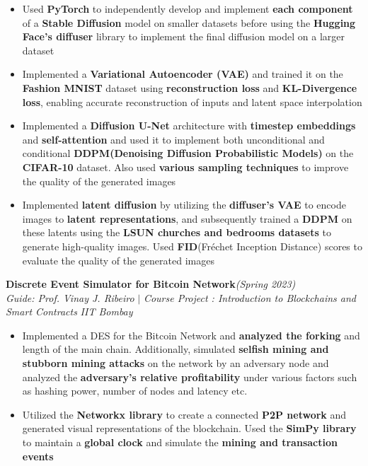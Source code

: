 \documentclass[a4paper,10pt]{article}
\begin{document}
\begin{itemize}[itemsep = -0.65 mm, leftmargin=*]
    \item Used \textbf{PyTorch} to independently develop and implement \textbf{each component} of a \textbf{Stable Diffusion} model on smaller datasets before using the \textbf{Hugging Face's diffuser} library to implement the final diffusion model on a larger dataset
    \item Implemented a \textbf{Variational Autoencoder (VAE)} and trained it on the \textbf{Fashion MNIST} dataset using \textbf{reconstruction loss} and \textbf{KL-Divergence loss}, enabling accurate reconstruction of inputs and latent space interpolation
    \item Implemented a \textbf{Diffusion U-Net} architecture with \textbf{timestep embeddings} and \textbf{self-attention} and used it to implement both unconditional and conditional \textbf{DDPM(Denoising Diffusion Probabilistic Models)} on the \textbf{CIFAR-10} dataset. Also used \textbf{various sampling techniques} to improve the quality of the generated images
    \item Implemented \textbf{latent diffusion} by utilizing the \textbf{diffuser's VAE} to encode images to \textbf{latent representations}, and subsequently trained a \textbf{DDPM} on these latents using the \textbf{LSUN churches and bedrooms datasets}  to generate high-quality images. Used \textbf{FID}(Fréchet Inception Distance) scores to evaluate the quality of the generated images
\end{itemize}
\vspace{\baselineskip}
\vspace{-15pt}
\noindent\textbf{\large Discrete Event Simulator for Bitcoin Network}\hfill{\sl \small (Spring 2023)}\\
{\it Guide: Prof. Vinay J. Ribeiro} $|$ {\it Course Project : Introduction to Blockchains and Smart Contracts } \hfill{\it IIT Bombay}\\
\vspace{-15pt}
\begin{itemize}[itemsep = -0.65 mm, leftmargin=*]
    \item Implemented a DES for the Bitcoin Network and \textbf{analyzed the forking} and length of the main chain. Additionally, simulated \textbf{selfish mining and stubborn mining attacks} on the network by an adversary node and analyzed the \textbf{adversary's relative profitability} under various factors such as hashing power, number of nodes and latency etc.
    \item Utilized the \textbf{Networkx library} to create a connected \textbf{P2P network} and generated visual representations of the blockchain. Used the \textbf{SimPy library} to maintain a \textbf{global clock} and simulate the \textbf{mining and transaction events}
\end{itemize}
\end{document}
